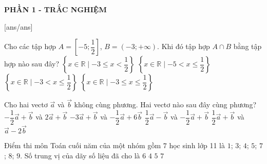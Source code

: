 
\begin{center}
	\textbf{PHẦN 1 - TRẮC NGHIỆM}
\end{center}
[ans/ans]
\begin{ex}%
	Cho các tập hợp $A=\left[-5;\dfrac{1}{2}\right]$, $B=\left(-3;+\infty\right)$. Khi đó tập hợp $A \cap B$ bằng tập hợp nào sau đây?
	\choice
	{$\left\{x \in \mathbb{R}\mid -3\leq x< \dfrac{1}{2}\right\}$}
	{$\left\{x \in \mathbb{R}\mid -5<x\leq \dfrac{1}{2}\right\}$}
	{\True $\left\{x \in \mathbb{R}\mid -3<x\leq \dfrac{1}{2}\right\}$}
	{$\left\{x \in \mathbb{R}\mid -3 \leq x\leq \dfrac{1}{2}\right\}$}
	\loigiai{
		Ta có $A \cap B= \left(-3;\dfrac{1}{2}\right]=\left\{x \in \mathbb{R}\mid -3<x\leq \dfrac{1}{2}\right\}$.
	}
\end{ex}
\begin{ex}%
	Cho hai vectơ $\overrightarrow{a}$ và $\overrightarrow{b}$ không cùng phương. Hai vectơ nào sau đây cùng phương?	
	\choice
	{$-\dfrac{1}{2}\overrightarrow{a}+\overrightarrow{b}$ và $2\overrightarrow{a}+\overrightarrow{b}$}
	{$-3\overrightarrow{a}+\overrightarrow{b}$ và $-\dfrac{1}{2}\overrightarrow{a}+6\overrightarrow{b}$}
	{\True $\dfrac{1}{2}\overrightarrow{a}-\overrightarrow{b}$ và $-\dfrac{1}{2}\overrightarrow{a}+\overrightarrow{b}$}
	{$\dfrac{1}{2}\overrightarrow{a}+\overrightarrow{b}$ và $\overrightarrow{a}-2\overrightarrow{b}$}
\end{ex}
\begin{ex}%
	Điểm thi môn Toán cuối năm của một nhóm gồm $7$ học sinh lớp 11 là $1$; $3$; $4$; $5$; $7$; $8$; $9$. Số trung vị của dãy số liệu đã cho là
	\choice
	{$6$}
	{$4$}
	{\True $5$}
	{$7$}
\end{ex}
